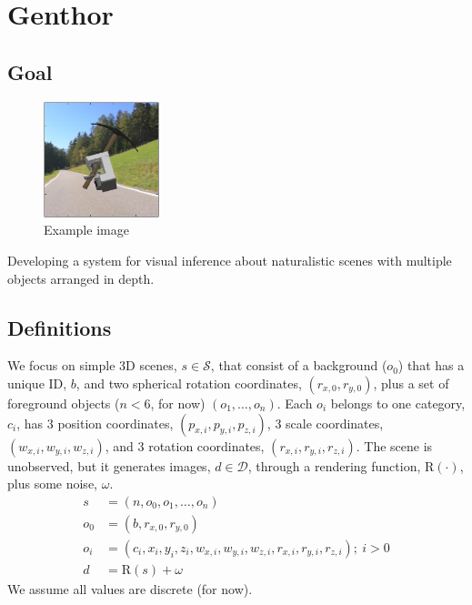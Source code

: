 \documentclass[]{report}
\begin{document}
\section*{Genthor}
\subsection*{Goal}
\setlength{\intextsep}{-40pt}
\begin{figure}
\vspace{-70pt}
\centering
\includegraphics[width=0.3\textwidth]{example.png}
\caption{Example image}
\end{figure}
\setlength{\intextsep}{40pt}

Developing a system for visual inference about naturalistic scenes
with multiple objects arranged in depth.

\subsection*{Definitions}
We focus on simple 3D scenes, $s \in \mathcal{S}$, that consist of a
background ($o_0$) that has a unique ID, $b$, and two spherical
rotation coordinates, $(r_{x,0}, r_{y,0})$, plus a set of foreground
objects ($n < 6$, for now) $(o_1,\dots,o_n)$. Each $o_i$ belongs to
one category, $c_i$, has 3 position coordinates,
$(p_{x,i},p_{y,i},p_{z,i})$, 3 scale coordinates,
$(w_{x,i},w_{y,i},w_{z,i})$, and 3 rotation coordinates,
$(r_{x,i},r_{y,i},r_{z,i})$.  The scene is unobserved, but it
generates images, $d \in \mathcal{D}$, through a rendering function,
$\mathrm{R}(\cdot)$, plus some noise, $\omega$.
\begin{align*}
  s &= (n,o_0,o_1,\dots,o_n)\\
  o_0 &= (b, r_{x,0}, r_{y,0})\\
  o_i &= (c_i, x_i,y_i,z_i, w_{x,i},w_{y,i},w_{z,i}, r_{x,i},r_{y,i},r_{z,i});\ i > 0\\
  d &= \mathrm{R}(s) + \omega
\end{align*}
We assume all values are discrete (for now).
\end{document}
